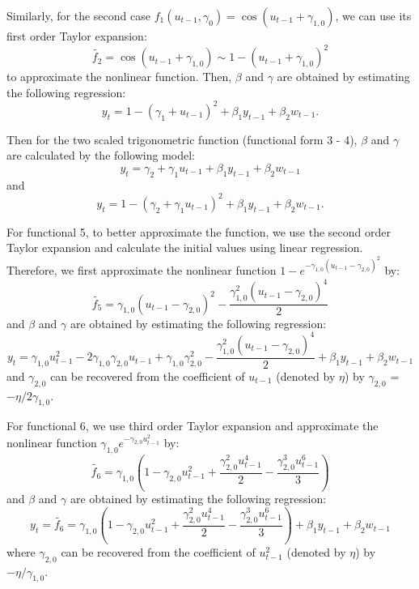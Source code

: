 \documentclass[a4paper,12pt,times,numbered,print,index]{report}
\numberwithin{equation}{section}
\begin{document}

Similarly, for the second case $f_{1}\left( u_{t-1},\gamma _{0}\right) =\cos \left( u_{t-1}+\gamma_{1,0}\right)$, we can use its first order Taylor expansion: 
$$
\tilde{f_2} = \cos \left( u_{t-1}+\gamma_{1,0}\right) \sim 1 - \left( u_{t-1}+\gamma_{1,0}\right)^2
$$ 
to approximate the nonlinear function. Then, $\beta$ and $\gamma$ are obtained by estimating the following regression:
$$
y_t = 1 - \left( \gamma_{1} + u_{t-1}\right)^2  + \beta_{1}y_{t-1} + \beta_2w_{t-1}.
$$

Then for the two scaled trigonometric function (functional form 3 - 4), $\beta$ and $\gamma$ are calculated by the following model:
$$
y_t = \gamma_{2}  + \gamma_{1}u_{t-1} + \beta_{1}y_{t-1} + \beta_2w_{t-1}
$$
and 
$$
y_t = 1 - \left( \gamma_{2} + \gamma_{1}u_{t-1}\right)^2  + \beta_{1}y_{t-1} + \beta_2w_{t-1}.
$$



For functional 5, to better approximate the function, we use the second order Taylor expansion and calculate the initial values using linear regression. Therefore, we first approximate the nonlinear function $1 - e^{-\gamma_{1,0}\left(u_{t-1}-\gamma_{2,0}\right)^{2}}$ by:
$$
\tilde{f_5} = \gamma_{1,0}(u_{t-1} - \gamma_{2,0})^2 - \dfrac{\gamma_{1,0}^2(u_{t-1} - \gamma_{2,0})^4}{2}
$$
and $\beta$ and $\gamma$ are obtained by estimating the following regression:
$$
y_t = \gamma_{1,0}u_{t-1}^2 - 2\gamma_{1,0}\gamma_{2,0}u_{t-1} + \gamma_{1,0}\gamma_{2,0}^2 - \dfrac{\gamma_{1,0}^2(u_{t-1} - \gamma_{2,0})^4}{2} + \beta_{1}y_{t-1} + \beta_2w_{t-1}
$$
and $\gamma_{2,0}$ can be recovered from the coefficient of $u_{t-1}$ (denoted by $\eta$) by $\gamma_{2,0}$ = $-\eta/2\gamma_{1,0}$.

For functional 6, we use third order Taylor expansion and approximate the nonlinear function $\gamma_{1,0}e^{-\gamma_{2,0}u_{t-1}^2}$ by:
$$
\tilde{f_6}= \gamma_{1,0}(1-\gamma_{2,0}u_{t-1}^2 + \dfrac{\gamma_{2,0}^2 u_{t-1}^4}{2} - \dfrac{\gamma_{2,0}^3 u_{t-1}^6}{3})
$$
and $\beta$ and $\gamma$ are obtained by estimating the following regression:
$$
y_t = \tilde{f_6}= \gamma_{1,0}(1-\gamma_{2,0}u_{t-1}^2 + \dfrac{\gamma_{2,0}^2 u_{t-1}^4}{2} - \dfrac{\gamma_{2,0}^3 u_{t-1}^6}{3}) + \beta_{1}y_{t-1} + \beta_2w_{t-1}
$$
where $\gamma_{2,0}$ can be recovered from the coefficient of $u_{t-1}^2$ (denoted by $\eta$) by $-\eta/\gamma_{1,0}$.
\end{document}
